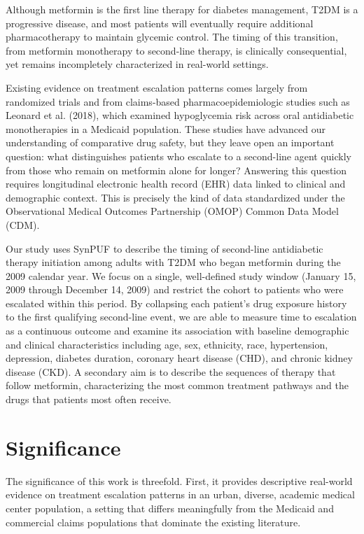 \documentclass[twoside,11pt]{article}
\begin{document}
Although metformin is the first line therapy for diabetes management, T2DM is a progressive disease, and most patients will eventually require additional pharmacotherapy to maintain glycemic control. The timing of this transition, from metformin monotherapy to second-line therapy, is clinically consequential, yet remains incompletely characterized in real-world settings\cite{khunti2013clinical_inertia,davies2018management,davies2022management_update}.

Existing evidence on treatment escalation patterns comes largely from randomized trials and from claims-based pharmacoepidemiologic studies such as Leonard et al. (2018), which examined hypoglycemia risk across oral antidiabetic monotherapies in a Medicaid population. These studies have advanced our understanding of comparative drug safety, but they leave open an important question: what distinguishes patients who escalate to a second-line agent quickly from those who remain on metformin alone for longer? Answering this question requires longitudinal electronic health record (EHR) data linked to clinical and demographic context. This is precisely the kind of data standardized under the Observational Medical Outcomes Partnership (OMOP) Common Data Model (CDM).

Our study uses SynPUF to describe the timing of second-line antidiabetic therapy initiation among adults with T2DM who began metformin during the 2009 calendar year. We focus on a single, well-defined study window (January 15, 2009 through December 14, 2009) and restrict the cohort to patients who were escalated within this period. By collapsing each patient's drug exposure history to the first qualifying second-line event, we are able to measure time to escalation as a continuous outcome and examine its association with baseline demographic and clinical characteristics including age, sex, ethnicity, race, hypertension, depression, diabetes duration, coronary heart disease (CHD), and chronic kidney disease (CKD). A secondary aim is to describe the sequences of therapy that follow metformin, characterizing the most common treatment pathways and the drugs that patients most often receive.


\section*{Significance}

The significance of this work is threefold. First, it provides descriptive real-world evidence on treatment escalation patterns in an urban, diverse, academic medical center population, a setting that differs meaningfully from the Medicaid and commercial claims populations that dominate the existing literature.
\end{document}
